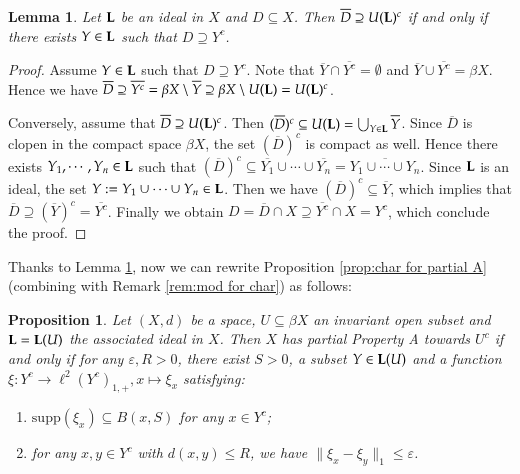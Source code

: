 \documentclass[12pt, a4paper]{amsart}
\numberwithin{equation}{section}
\newtheorem{lem}[thm]{Lemma}
\newtheorem{prop}[thm]{Proposition}
\newenvironment{propbiss}[1]
  {\renewcommand{\thethm}{\ref{#1}$''$}%
   \addtocounter{thm}{-1}%
   \begin{prop}}
  {\end{prop}}
\theoremstyle{definition}
\theoremstyle{remark}
\def\L{\mathcal{L}}
\def\supp{\mathrm{supp}}
\def\L{{\bf L}}
\begin{document}
\begin{lem}\label{lem:relating ideals and D}
Let $\L$ be an ideal in $X$ and $D \subseteq X$. Then $\overline{D} \supseteq U(\L)^c$ \emph{if and only if} there exists $Y \in \L$ such that $D \supseteq Y^c$.
\end{lem}

\begin{proof}
Assume $Y \in \L$ such that $D \supseteq Y^c$. Note that $\overline{Y} \cap \overline{Y^c} = \emptyset$ and $\overline{Y} \cup \overline{Y^c} = \beta X$. Hence we have $\overline{D} \supseteq \overline{Y^c} = \beta X \setminus \overline{Y} \supseteq \beta X \setminus U(\L) = U(\L)^c$.

Conversely, assume that $\overline{D} \supseteq U(\L)^c$. Then $(\overline{D})^c \subseteq U(\L) = \bigcup_{Y \in \L} \overline{Y}$. Since $\overline{D}$ is clopen in the compact space $\beta X$, the set $(\overline{D})^c$ is compact as well. Hence there exists $Y_1, \cdots, Y_n \in \L$ such that $(\overline{D})^c \subseteq \overline{Y_1} \cup \cdots \cup \overline{Y_n} = \overline{Y_1 \cup \cdots \cup Y_n}$. Since $\L$ is an ideal, the set $Y:=Y_1 \cup \cdots \cup Y_n \in \L$. Then we have $(\overline{D})^c \subseteq \overline{Y}$, which implies that $\overline{D} \supseteq (\overline{Y})^c = \overline{Y^c}$. Finally we obtain $D = \overline{D} \cap X \supseteq \overline{Y^c} \cap X = Y^c$, which conclude the proof.
\end{proof}

Thanks to Lemma \ref{lem:relating ideals and D}, now we can rewrite Proposition \ref{prop:char for partial A} (combining with Remark \ref{rem:mod for char}) as follows:

\begin{propbiss}{prop:char for partial A}
Let $(X,d)$ be a space, $U \subseteq \beta X$ an invariant open subset and $\L=\L(U)$ the associated ideal in $X$. Then $X$ has partial Property A towards $U^c$ \emph{if and only if} for any $\varepsilon, R>0$, there exist $S>0$, a subset $Y \in \L(U)$ and a function $\xi: Y^c \to \ell^2(Y^c)_{1,+}, x \mapsto \xi_x$ satisfying:
\begin{enumerate}
  \item $\supp(\xi_x) \subseteq B(x,S)$ for any $x\in Y^c$;
  \item for any $x, y\in Y^c$ with $d(x,y) \leq R$, we have $\|\xi_x - \xi_y\|_1 \leq \varepsilon$.
\end{enumerate}
\end{propbiss}
\end{document}
